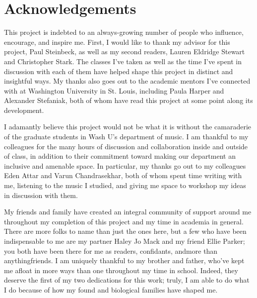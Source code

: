 \documentclass[12pt]{report}
\begin{document}
\thispagestyle{empty}

\frenchspacing


\setcounter{page}{2}
    \tableofcontents
    \listoffigures
    \listoftables

    \chapter*{Acknowledgements}

This project is indebted to an always-growing number of people who influence, encourage, 
and inspire me. First, I would like to thank my advisor for this project, Paul Steinbeck, 
as well as my second readers, Lauren Eldridge Stewart and Christopher Stark. The classes 
I've taken as well as the time I've spent in discussion with each of them have helped 
shape this project in distinct and insightful ways. My thanks also goes out to the academic 
mentors I've connected with at Washington University in St. Louis, including Paula Harper 
and Alexander Stefaniak, both of whom have read this project at some point along its 
development.
 
I adamantly believe this project would not be what it is without the camaraderie of the 
graduate students in Wash U's department of music. I am thankful to my colleagues for the 
many hours of discussion and collaboration inside and outside of class, in addition to their 
commitment toward making our department an inclusive and amenable space. In particular, my
thanks go out to my colleagues Eden Attar and Varun Chandrasekhar, both of whom spent time 
writing with me, listening  to the music I studied, and giving me space to workshop my 
ideas in discussion with them.

My friends and family have created an integral community of support around me throughout my 
completion of this project and my time in academia in general. There are more folks to name 
than just the ones here, but a few who have been indispensable to me are my partner Haley 
Jo Mack and my friend Ellie Parker; you both have been there for me as readers, confidants, 
and\textemdash more than anything\textemdash friends. I am uniquely thankful to my brother 
and father, who've kept me afloat in more ways than one throughout my time in school. Indeed,
they deserve the first of my two dedications for this work; truly, I am able to do what I do
because of how my found and biological families have shaped me.
\end{document}
